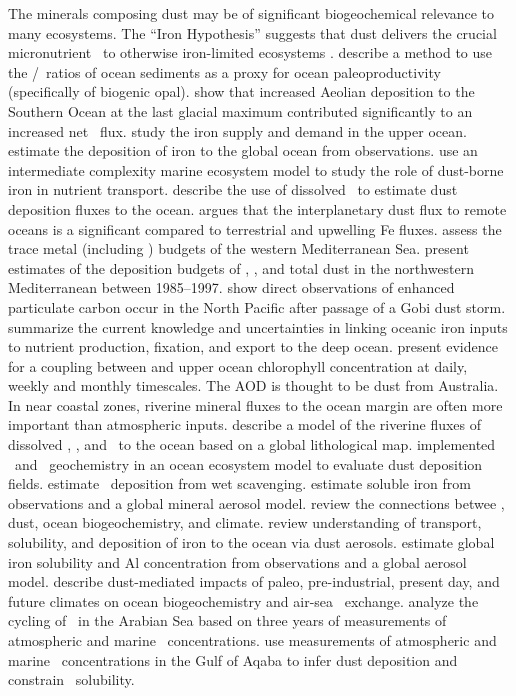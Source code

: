 \documentclass[12pt,twoside]{book}
\begin{document}
The minerals composing dust may be of significant biogeochemical
relevance to many ecosystems.
The ``Iron Hypothesis'' suggests that dust delivers the crucial
micronutrient \FeIII\ to otherwise iron-limited ecosystems
\cite[]{MaF88,Mar90}. 
\cite{DCM97} describe a method to use the \Al/\Ti\ ratios of ocean
sediments as a proxy for ocean paleoproductivity (specifically
of biogenic opal).
\cite{MAR00} show that increased Aeolian deposition to the Southern
Ocean at the last glacial maximum contributed significantly to an increased
net \COd\ flux.
\cite{FMT00} study the iron supply and demand in the upper ocean.
\cite{GKT01} estimate the deposition of iron to the global ocean from observations.
\cite{MDG02} use an intermediate complexity marine ecosystem model
\cite[]{MDK02} to study the role of dust-borne iron in nutrient
transport. 
\cite{MeV00} describe the use of dissolved \Al\ to estimate dust
deposition fluxes to the ocean.
\cite{Joh01} argues that the interplanetary dust flux to remote oceans
is a significant compared to terrestrial and upwelling Fe fluxes.
\cite{EGM01} assess the trace metal (including \Fe) budgets of the
western Mediterranean Sea.
\cite{RGL99} present estimates of the deposition budgets of \Fe, \Al,
and total dust in the northwestern Mediterranean between 1985--1997. 
\cite{BDS02} show direct observations of enhanced particulate carbon
occur in the North Pacific after passage of a Gobi dust storm.
\cite{JMS02} summarize the current knowledge and uncertainties in
linking oceanic iron inputs to nutrient production, fixation, and
export to the deep ocean.
\cite{GCA02} present evidence for a coupling between  
 and upper ocean chlorophyll concentration at daily,
weekly and monthly timescales. 
The AOD is thought to be dust from Australia.
In near coastal zones, riverine mineral fluxes to the ocean margin are
often more important than atmospheric inputs.
\cite{JMT02} describe a model of the riverine fluxes of dissolved
\HCOtm, \Si, and \Ge\ to the ocean based on a global lithological
map. 
\cite{GHM03} implemented \Al\ and \Si\ geochemistry in an ocean
ecosystem model to evaluate dust deposition fields.
\cite{GFS03} estimate \Fe\ deposition from wet scavenging.
\cite{HMC04} estimate soluble iron from observations and a global
mineral aerosol model. 
\cite{JAA05} review the connections betwee \Fe, dust, ocean
biogeochemistry, and climate.
\cite{MBB05} review understanding of transport, solubility, and
deposition of iron to the ocean via dust aerosols.
\cite{LMM05} estimate global iron solubility and Al concentration
from observations and a global aerosol model.
\cite{MDL06} describe dust-mediated impacts of paleo, pre-industrial,
present day, and future climates on ocean biogeochemistry and air-sea 
\COd\ exchange.
\cite{SBD05} analyze the cycling of \Al\ in the Arabian Sea based on
three years of measurements of atmospheric and marine \Al\
concentrations. 
\cite{CPJ07} use measurements of atmospheric and marine \Fe\
concentrations in the Gulf of Aqaba to infer dust deposition and
constrain \Fe\ solubility.
\end{document}

